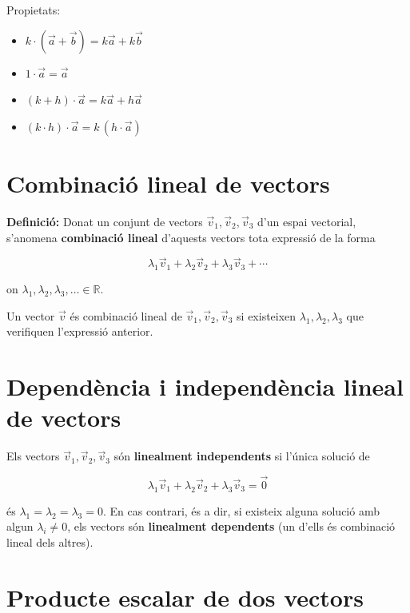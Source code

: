 Propietats:

\begin{itemize}
\item $k\cdot(\vec a + \vec b) = k\vec a + k\vec b$
\item $1\cdot\vec a = \vec a$
\item $(k + h)\cdot\vec a = k\vec a + h\vec a$
\item $(k\cdot h)\cdot\vec a = k\,(h\cdot\vec a)$
\end{itemize}

\section{Combinació lineal de vectors}

\textbf{Definició:} Donat un conjunt de vectors $\vec v_1, \vec v_2, \vec v_3$ d'un espai vectorial, s'anomena \textbf{combinació lineal} d'aquests vectors tota expressió de la forma

\begin{equation}
\lambda_1\vec v_1 + \lambda_2\vec v_2 + \lambda_3\vec v_3 + \cdots
\end{equation}

on $\lambda_1, \lambda_2, \lambda_3, \ldots \in \mathbb{R}$.

Un vector $\vec v$ és combinació lineal de $\vec v_1, \vec v_2, \vec v_3$ si existeixen $\lambda_1, \lambda_2, \lambda_3$ que verifiquen l'expressió anterior.

\section{Dependència i independència lineal de vectors}

Els vectors $\vec v_1, \vec v_2, \vec v_3$ són \textbf{linealment independents} si l'única solució de

\begin{equation*}
\lambda_1\vec v_1 + \lambda_2\vec v_2 + \lambda_3\vec v_3 = \vec 0
\end{equation*}

és $\lambda_1 = \lambda_2 = \lambda_3 = 0$. En cas contrari, és a dir, si existeix alguna solució amb algun $\lambda_i \neq 0$, els vectors són \textbf{linealment dependents} (un d'ells és combinació lineal dels altres).

\section{Producte escalar de dos vectors}

